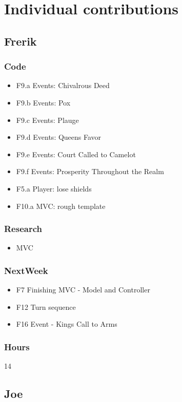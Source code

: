 \documentclass[10pt,a4paper]{article}
\begin{document}
\newpage
\section*{Individual contributions}

\subsection*{Frerik}

\subsubsection*{Code}
\begin{itemize}
\item F9.a Events: Chivalrous Deed
\item F9.b Events: Pox
\item F9.c Events: Plauge
\item F9.d Events: Queens Favor
\item F9.e Events: Court Called to Camelot
\item F9.f Events: Prosperity Throughout the Realm
\item F5.a Player: lose shields
\item F10.a MVC: rough template
\end{itemize}
\subsubsection*{Research}
\begin{itemize}
\item MVC
\end{itemize}
\subsubsection*{NextWeek}
\begin{itemize}
\item F7 Finishing MVC - Model and Controller
\item F12 Turn sequence
\item F16 Event - Kings Call to Arms
\end{itemize}
\subsubsection*{Hours}
14

\subsection*{Joe}
\end{document}
